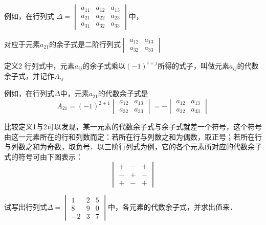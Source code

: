 例如，在行列式
$\Delta =\begin{vmatrix}
    a_{11}&a_{12}&a_{13}\\
    a_{21}&a_{22}&a_{23}\\
    a_{31}&a_{32}&a_{33}
\end{vmatrix}$中，

对应于元素$a_{21}$的余子式是二阶行列式$\begin{vmatrix}
    a_{12}&a_{13}\\a_{32}&a_{33}
\end{vmatrix}$


\begin{blk}{定义2}
    行列式中，元素$a_{ij}$的余子式乘以$(-1)^{i+j}$所得的式子，叫做元素$a_{ij}$的代数余子式，并记作$A_{ij}$
\end{blk}

例如，在行列式$\Delta$中，元素$a_{21}$的代数余子式是
\[A_{21}=(-1)^{2+1}\begin{vmatrix}
    a_{12}&a_{13}\\a_{32}&a_{33}
\end{vmatrix}=-\begin{vmatrix}
    a_{12}&a_{13}\\a_{32}&a_{33}
\end{vmatrix}\]


比较定义1与2可以发现，某一元素的代数余子式与余子式就差一个符号，这个符号由这一元素所在的行和列数而定：若所在行与列数之和为偶数，取正号；若所在行与列数之和为奇数，取负号．以三阶行列式为例，它的各个元素所对应的代数余子式的符号可由下图表示：
\[\begin{vmatrix}
    +&-&+\\-&+&-\\ +&-&+
\end{vmatrix}\]


\begin{example}
    试写出行列式$\Delta=\begin{vmatrix}
        1&2&5\\8&9&0\\-2&3&7
    \end{vmatrix}$中，各元素的代数余子式，并求出值来．
\end{example}


